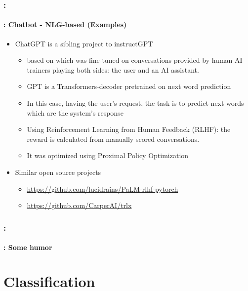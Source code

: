 \documentclass[xcolor=table]{beamer}
\begin{document}
\begin{frame}
	\frametitle{\insertshortsubtitle: \insertsection}
	\framesubtitle{\insertsubsection: Chatbot - NLG-based (Examples)}
	
	\begin{itemize}
		\item ChatGPT is a sibling project to instructGPT \cite{2022-ouyang-al}
		\begin{itemize}
			\item based on  which was fine-tuned on conversations provided by human AI trainers playing both sides: the user and an AI assistant. 
			\item GPT is a Transformers-decoder pretrained on next word prediction
			\item In this case, having the user's request, the task is to predict next words which are the system's response
			\item Using Reinforcement Learning from Human Feedback (RLHF): the reward is calculated from manually scored conversations.
			\item It was optimized using Proximal Policy Optimization \cite{2017-schulman-al}
		\end{itemize}
	\item Similar open source projects
	\begin{itemize}
		\item \url{https://github.com/lucidrains/PaLM-rlhf-pytorch}
		\item \url{https://github.com/CarperAI/trlx}
	\end{itemize}
	\end{itemize}
	
\end{frame}


\begin{frame}
	\frametitle{\insertshortsubtitle: \insertsection}
	\framesubtitle{\insertsubsection: Some humor}
	
	\begin{center}
	\end{center}
\end{frame}


\section{Classification}
\end{document}
